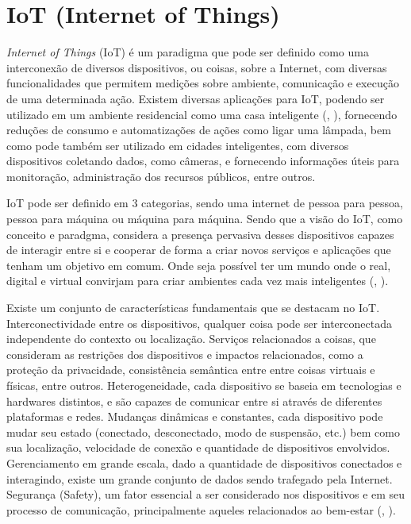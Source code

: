 \documentclass[]{politex}
\begin{document}
\section{IoT (Internet of Things)}
\textit{Internet of Things} (IoT) é um paradigma que pode ser definido como uma interconexão de diversos dispositivos, ou coisas, sobre a Internet, com diversas funcionalidades que permitem medições sobre ambiente, comunicação e execução de uma determinada ação. Existem diversas aplicações para IoT, podendo ser utilizado em um ambiente residencial como uma casa inteligente (, \citeyear{iot_kelly}), fornecendo reduções de consumo e automatizações de ações como ligar uma lâmpada, bem como pode também ser utilizado em cidades inteligentes, com diversos dispositivos coletando dados, como câmeras, e fornecendo informações úteis para monitoração, administração dos recursos públicos, entre outros.

IoT pode ser definido em 3 categorias, sendo uma internet de pessoa para pessoa, pessoa para máquina ou máquina para máquina. Sendo que a visão do IoT, como conceito e paradgma, considera a presença pervasiva desses dispositivos capazes de interagir entre si e cooperar de forma a criar novos serviços e aplicações que tenham um objetivo em comum. Onde seja possível ter um mundo onde o real, digital e virtual convirjam para criar ambientes cada vez mais inteligentes (, \citeyear{iot_patel}).

Existe um conjunto de características fundamentais que se destacam no IoT. Interconectividade entre os dispositivos, qualquer coisa pode ser interconectada independente do contexto ou localização. Serviços relacionados a coisas,  que consideram as restrições dos dispositivos e impactos relacionados, como a proteção da privacidade,  consistência semântica entre entre coisas virtuais e físicas, entre outros. Heterogeneidade, cada dispositivo se baseia em tecnologias e hardwares distintos, e são capazes de comunicar entre si através de diferentes plataformas e redes. Mudanças dinâmicas e constantes, cada dispositivo pode mudar seu estado (conectado, desconectado, modo de suspensão, etc.) bem como sua localização, velocidade de conexão e quantidade de dispositivos envolvidos. Gerenciamento em grande escala, dado a quantidade de dispositivos conectados e interagindo, existe um grande conjunto de dados sendo trafegado pela Internet. Segurança (Safety), um fator essencial a ser considerado nos dispositivos e em seu processo de comunicação, principalmente aqueles relacionados ao bem-estar (, \citeyear{iot_patel}).
\end{document}
